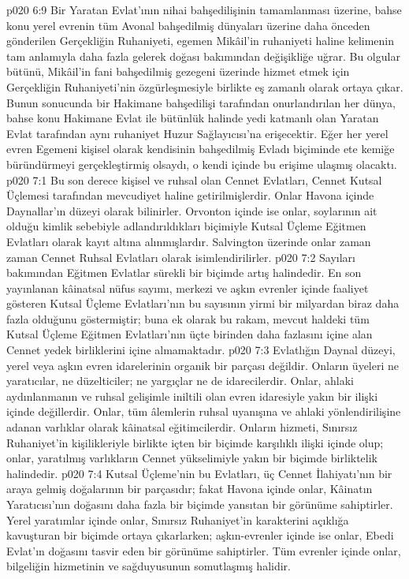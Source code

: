 \vs p020 6:9 Bir Yaratan Evlat’ının nihai bahşedilişinin tamamlanması üzerine, bahse konu yerel evrenin tüm Avonal bahşedilmiş dünyaları üzerine daha önceden gönderilen Gerçekliğin Ruhaniyeti, egemen Mikâil’in ruhaniyeti haline kelimenin tam anlamıyla daha fazla gelerek doğası bakımından değişikliğe uğrar. Bu olgular bütünü, Mikâil’in fani bahşedilmiş gezegeni üzerinde hizmet etmek için Gerçekliğin Ruhaniyeti’nin özgürleşmesiyle birlikte eş zamanlı olarak ortaya çıkar. Bunun sonucunda bir Hakimane bahşedilişi tarafından onurlandırılan her dünya, bahse konu Hakimane Evlat ile bütünlük halinde yedi katmanlı olan Yaratan Evlat tarafından aynı ruhaniyet Huzur Sağlayıcısı’na erişecektir. Eğer her yerel evren Egemeni kişisel olarak kendisinin bahşedilmiş Evladı biçiminde ete kemiğe büründürmeyi gerçekleştirmiş olsaydı, o kendi içinde bu erişime ulaşmış olacaktı.
\vs p020 7:1 Bu son derece kişisel ve ruhsal olan Cennet Evlatları, Cennet Kutsal Üçlemesi tarafından mevcudiyet haline getirilmişlerdir. Onlar Havona içinde Daynallar'ın düzeyi olarak bilinirler. Orvonton içinde ise onlar, soylarının ait olduğu kimlik sebebiyle adlandırıldıkları biçimiyle Kutsal Üçleme Eğitmen Evlatları olarak kayıt altına alınmışlardır. Salvington üzerinde onlar zaman zaman Cennet Ruhsal Evlatları olarak isimlendirilirler.
\vs p020 7:2 Sayıları bakımından Eğitmen Evlatlar sürekli bir biçimde artış halindedir. En son yayınlanan kâinatsal nüfus sayımı, merkezi ve aşkın evrenler içinde faaliyet gösteren Kutsal Üçleme Evlatları’nın bu sayısının yirmi bir milyardan biraz daha fazla olduğunu göstermiştir; buna ek olarak bu rakam, mevcut haldeki tüm Kutsal Üçleme Eğitmen Evlatları’nın üçte birinden daha fazlasını içine alan Cennet yedek birliklerini içine almamaktadır.
\vs p020 7:3 Evlatlığın Daynal düzeyi, yerel veya aşkın evren idarelerinin organik bir parçası değildir. Onların üyeleri ne yaratıcılar, ne düzelticiler; ne yargıçlar ne de idarecilerdir. Onlar, ahlaki aydınlanmanın ve ruhsal gelişimle iniltili olan evren idaresiyle yakın bir ilişki içinde değillerdir. Onlar, tüm âlemlerin ruhsal uyanışına ve ahlaki yönlendirilişine adanan varlıklar olarak kâinatsal eğitimcilerdir. Onların hizmeti, Sınırsız Ruhaniyet’in kişilikleriyle birlikte içten bir biçimde karşılıklı ilişki içinde olup; onlar, yaratılmış varlıkların Cennet yükselimiyle yakın bir biçimde birliktelik halindedir.
\vs p020 7:4 Kutsal Üçleme’nin bu Evlatları, üç Cennet İlahiyatı’nın bir araya gelmiş doğalarının bir parçasıdır; fakat Havona içinde onlar, Kâinatın Yaratıcısı’nın doğasını daha fazla bir biçimde yansıtan bir görünüme sahiptirler. Yerel yaratımlar içinde onlar, Sınırsız Ruhaniyet’in karakterini açıklığa kavuşturan bir biçimde ortaya çıkarlarken; aşkın\hyp{}evrenler içinde ise onlar, Ebedi Evlat’ın doğasını tasvir eden bir görünüme sahiptirler. Tüm evrenler içinde onlar, bilgeliğin hizmetinin ve sağduyusunun somutlaşmış halidir.
